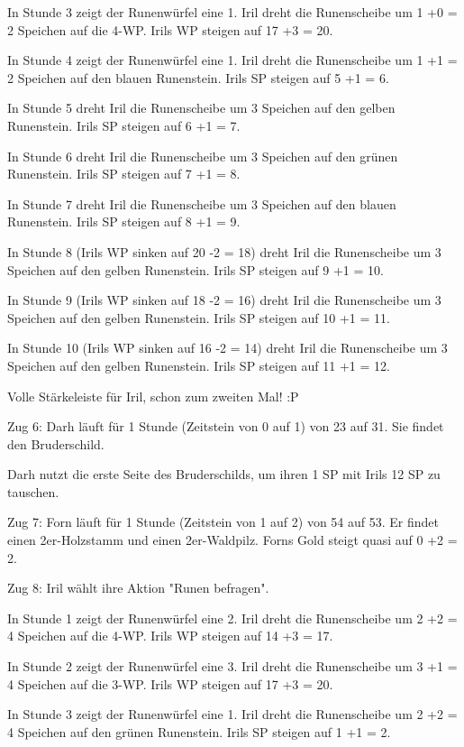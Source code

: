 \documentclass[10pt, a4paper, oneside]{book}
\begin{document}
{In Stunde 3 zeigt der Runenwürfel eine 1. Iril dreht die Runenscheibe um 1 +0 = 2 Speichen auf die 4-WP. Irils WP steigen auf 17 +3 = 20.

In Stunde 4 zeigt der Runenwürfel eine 1. Iril dreht die Runenscheibe um 1 +1 = 2 Speichen auf den blauen Runenstein. Irils SP steigen auf 5 +1 = 6.

In Stunde 5 dreht Iril die Runenscheibe um 3 Speichen auf den gelben Runenstein. Irils SP steigen auf 6 +1 = 7.

In Stunde 6 dreht Iril die Runenscheibe um 3 Speichen auf den grünen Runenstein. Irils SP steigen auf 7 +1 = 8.

In Stunde 7 dreht Iril die Runenscheibe um 3 Speichen auf den blauen Runenstein. Irils SP steigen auf 8 +1 = 9.

In Stunde 8 (Irils WP sinken auf 20 -2 = 18) dreht Iril die Runenscheibe um 3 Speichen auf den gelben Runenstein. Irils SP steigen auf 9 +1 = 10.

In Stunde 9 (Irils WP sinken auf 18 -2 = 16) dreht Iril die Runenscheibe um 3 Speichen auf den gelben Runenstein. Irils SP steigen auf 10 +1 = 11.

In Stunde 10 (Irils WP sinken auf 16 -2 = 14) dreht Iril die Runenscheibe um 3 Speichen auf den gelben Runenstein. Irils SP steigen auf 11 +1 = 12.

Volle Stärkeleiste für Iril, schon zum zweiten Mal! :P



Zug 6: Darh läuft für 1 Stunde (Zeitstein von 0 auf 1) von 23 auf 31. Sie findet den Bruderschild.

Darh nutzt die erste Seite des Bruderschilds, um ihren 1 SP mit Irils 12 SP zu tauschen.



Zug 7: Forn läuft für 1 Stunde (Zeitstein von 1 auf 2) von 54 auf 53. Er findet einen 2er-Holzstamm und einen 2er-Waldpilz. Forns Gold steigt quasi auf 0 +2 = 2.



Zug 8: Iril wählt ihre Aktion "Runen befragen".

In Stunde 1 zeigt der Runenwürfel eine 2. Iril dreht die Runenscheibe um 2 +2 = 4 Speichen auf die 4-WP. Irils WP steigen auf 14 +3 = 17.

In Stunde 2 zeigt der Runenwürfel eine 3. Iril dreht die Runenscheibe um 3 +1 = 4 Speichen auf die 3-WP. Irils WP steigen auf 17 +3 = 20.

In Stunde 3 zeigt der Runenwürfel eine 1. Iril dreht die Runenscheibe um 2 +2 = 4 Speichen auf den grünen Runenstein. Irils SP steigen auf 1 +1 = 2.

}
\end{document}
